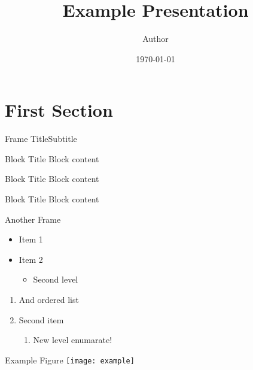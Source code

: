 \documentclass[aspectratio=1610]{beamer}
\title{Example Presentation}
\author{Author}
\date{\today}
\begin{document}
\startpage
\begin{frame}[noframenumbering]

  \maketitle

\end{frame}


\normalpage
\section{First Section}
\begin{frame}{Frame Title}{Subtitle}
\begin{block}{Block Title}
    Block content
\end{block}
\begin{alertblock}{Block Title}
    Block content
\end{alertblock}

\begin{example}{Block Title}
    Block content
\end{example}
\end{frame}

\begin{frame}{Another Frame}
\begin{itemize}
    \item Item 1
    \item Item 2
    \begin{itemize}
        \item Second level
    \end{itemize}
\end{itemize}

\begin{enumerate}
    \item And ordered list
    \item Second item
    \begin{enumerate}
        \item New level enumarate!
    \end{enumerate}
\end{enumerate}
\end{frame}

\begin{frame}{Example Figure}
\texttt{[image: example]}
\end{frame}
\end{document}
